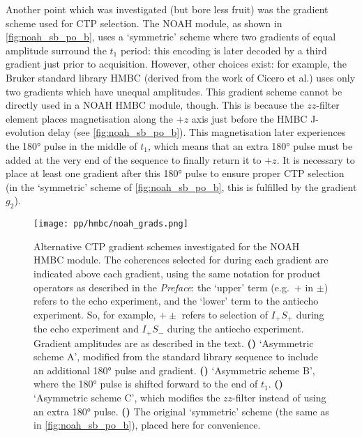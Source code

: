 Another point which was investigated (but bore less fruit) was the gradient scheme used for CTP selection.
The NOAH module, as shown in \cref{fig:noah_sb_po_b}, uses a `symmetric' scheme where two gradients of equal amplitude surround the $t_1$ period: this encoding is later decoded by a third gradient just prior to acquisition.
However, other choices exist: for example, the Bruker standard library HMBC (derived from the work of Cicero et al.\autocite{Cicero2001JMR}) uses only two gradients which have unequal amplitudes.
This gradient scheme cannot be directly used in a NOAH HMBC module, though.
This is because the $zz$-filter element places  magnetisation along the $+z$ axis just before the HMBC J-evolution delay (see \cref{fig:noah_sb_po_b}).
This magnetisation later experiences the \proton{} \ang{180} pulse in the middle of $t_1$, which means that an extra \ang{180} pulse must be added at the very end of the sequence to finally return it to $+z$.
It is necessary to place at least one gradient after this \ang{180} pulse to ensure proper CTP selection (in the `symmetric' scheme of \cref{fig:noah_sb_po_b}, this is fulfilled by the gradient $g_2$).

\begin{figure}[!htbp]
    \centering
    \texttt{[image: pp/hmbc/noah\_grads.png]}%
    {\label{fig:noah_hmbc_grads_bga}}%
    {\label{fig:noah_hmbc_grads_bgb}}%
    {\label{fig:noah_hmbc_grads_bgc}}%
    {\label{fig:noah_hmbc_grads_b}}%
    \caption[Alternative CTP gradient schemes investigated for NOAH HMBC]{
        Alternative CTP gradient schemes investigated for the NOAH HMBC module.
        The coherences selected for during each gradient are indicated above each gradient, using the same notation for product operators as described in the \textit{Preface}: the `upper' term (e.g.\ $+$ in $\pm$) refers to the echo experiment, and the `lower' term to the antiecho experiment.
        So, for example, $+\pm$ refers to selection of $I_+S_+$ during the echo experiment and $I_+S_-$ during the antiecho experiment.
        Gradient amplitudes are as described in the text.
        \textbf{()} `Asymmetric scheme A', modified from the standard library sequence to include an additional \ang{180} pulse and gradient.
        \textbf{()} `Asymmetric scheme B', where the \ang{180} pulse is shifted forward to the end of $t_1$.
        \textbf{()} `Asymmetric scheme C', which modifies the $zz$-filter instead of using an extra \ang{180} pulse.
        \textbf{()} The original `symmetric' scheme (the same as in \cref{fig:noah_sb_po_b}), placed here for convenience.
    }
    \label{fig:noah_hmbc_grads}
\end{figure}

